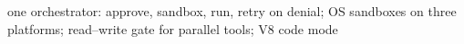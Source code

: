 one orchestrator: approve, sandbox, run, retry on denial; OS sandboxes on three platforms; read--write gate for parallel tools; V8 code mode
